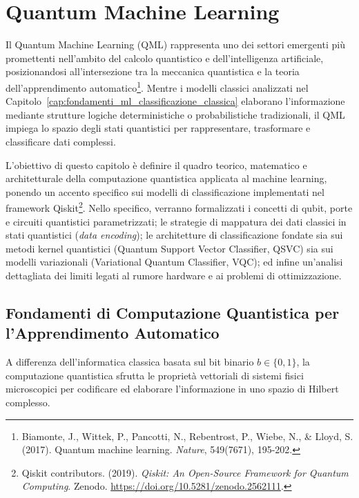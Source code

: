 \chapter{Quantum Machine Learning}
\label{cap:quantum_machine_learning}

Il Quantum Machine Learning (QML) rappresenta uno dei settori emergenti più promettenti nell'ambito del calcolo quantistico e dell'intelligenza artificiale, posizionandosi all'intersezione tra la meccanica quantistica e la teoria dell'apprendimento automatico\footnote{Biamonte, J., Wittek, P., Pancotti, N., Rebentrost, P., Wiebe, N., \& Lloyd, S. (2017). Quantum machine learning. \textit{Nature}, 549(7671), 195-202.}. Mentre i modelli classici analizzati nel Capitolo~\ref{cap:fondamenti_ml_classificazione_classica} elaborano l'informazione mediante strutture logiche deterministiche o probabilistiche tradizionali, il QML impiega lo spazio degli stati quantistici per rappresentare, trasformare e classificare dati complessi.

L'obiettivo di questo capitolo è definire il quadro teorico, matematico e architetturale della computazione quantistica applicata al machine learning, ponendo un accento specifico sui modelli di classificazione implementati nel framework Qiskit\footnote{Qiskit contributors. (2019). \textit{Qiskit: An Open-Source Framework for Quantum Computing}. Zenodo. \url{https://doi.org/10.5281/zenodo.2562111}.}. Nello specifico, verranno formalizzati i concetti di qubit, porte e circuiti quantistici parametrizzati; le strategie di mappatura dei dati classici in stati quantistici (\textit{data encoding}); le architetture di classificazione fondate sia sui metodi kernel quantistici (Quantum Support Vector Classifier, QSVC) sia sui modelli variazionali (Variational Quantum Classifier, VQC); ed infine un'analisi dettagliata dei limiti legati al rumore hardware e ai problemi di ottimizzazione.

\section{Fondamenti di Computazione Quantistica per l'Apprendimento Automatico}
\label{sec:fondamenti_computazione_quantistica}

A differenza dell'informatica classica basata sul bit binario $b \in \{0, 1\}$, la computazione quantistica sfrutta le proprietà vettoriali di sistemi fisici microscopici per codificare ed elaborare l'informazione in uno spazio di Hilbert complesso.

